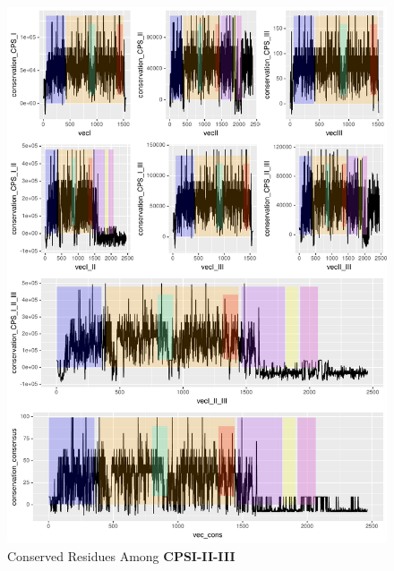 \documentclass[a4paper]{article}
\begin{document}
\newpage
\begin{figure}[H]
\begin{center}
\includegraphics[width=\textwidth]{pairwise.pdf}
\end{center}
\caption{Conserved Residues Among \textbf{CPSI-II-III}}
\label{fig:biggraph1}
\end{figure}

\newpage
\end{document}
